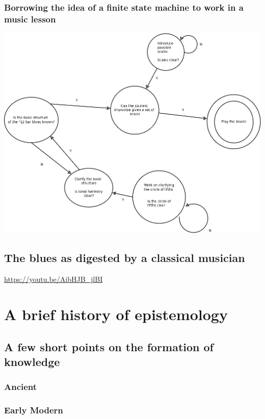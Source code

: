 \documentclass[11pt]{article}
\begin{document}
\subsubsection{Borrowing the idea of a finite state machine to work in a music lesson}
\label{sec:orgbde784b}

\begin{center}
\includegraphics[width=.9\linewidth]{../img/blues_flowEng.png}
\end{center}


\subsection{The blues as digested by a classical musician}
\label{sec:org36b532b}
\url{https://youtu.be/AibHJB\_jlBI}


\section{A brief history of epistemology}
\label{sec:org5839335}
\subsection{A few short points on the formation of knowledge}
\label{sec:org4c7c1aa}
\subsubsection{Ancient}
\label{sec:org6333e57}
\subsubsection{Early Modern}
\label{sec:org71b3c3b}
\end{document}
